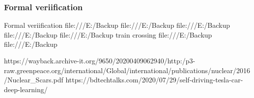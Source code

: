 \subsubsection{Formal veriification}
Formal veriification
file:///E:/Backup%
file:///E:/Backup%
file:///E:/Backup%
file:///E:/Backup%
file:///E:/Backup%
train crossing
file:///E:/Backup%
file:///E:/Backup%



https://wayback.archive-it.org/9650/20200409062940/http:/p3-raw.greenpeace.org/international/Global/international/publications/nuclear/2016/Nuclear_Scars.pdf
https://bdtechtalks.com/2020/07/29/self-driving-tesla-car-deep-learning/




